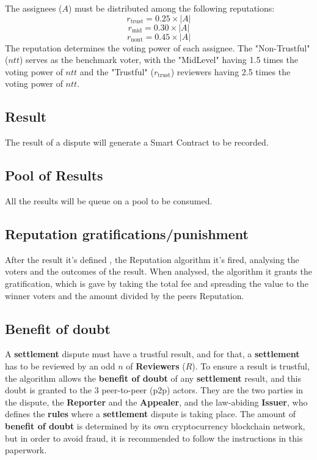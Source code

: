 \documentclass{article}
\begin{document}
The assignees (\(A\)) must be distributed among the following reputations: 
\[ r_{\text{trust}} = 0.25 \times |A|\]
\[ r_{\text{mid}} = 0.30 \times |A|\]
\[ r_{\text{nont}} = 0.45 \times |A| \] 
The reputation determines the voting power of each assignee. The "Non-Trustful" (\(ntt\)) serves as the benchmark voter, with the "MidLevel" having 1.5 times the voting power of \(ntt\) and the "Trustful" (\(r_{\text{trust}}\)) reviewers having 2.5 times the voting power of \(ntt\).

\subsection{Result}

The result of a dispute will generate a Smart Contract to be recorded.

\subsection{Pool of Results}

All the results will be queue on a pool to be consumed.

\subsection{Reputation gratifications/punishment}

After the result it's defined , the Reputation algorithm it's fired, analysing the voters and the outcomes of the result.
When analysed, the algorithm it grants the gratification, which is gave by taking the total fee and spreading the value 
to the winner voters and the amount divided by the peers Reputation.

\subsection{Benefit of doubt}
A \textbf{settlement} dispute must have a trustful result, and for that, a \textbf{settlement} has to be reviewed by an odd \(n\) of \textbf{Reviewers} (\(R\)). To ensure a result is trustful, the algorithm allows the \textbf{benefit of doubt} of any \textbf{settlement} result, and this doubt is granted to the 3 peer-to-peer (p2p) actors. They are the two parties in the dispute, the \textbf{Reporter} and the \textbf{Appealer}, and the law-abiding \textbf{Issuer}, who defines the \textbf{rules} where a \textbf{settlement} dispute is taking place. The amount of \textbf{benefit of doubt} is determined by its own cryptocurrency blockchain network, but in order to avoid fraud, it is recommended to follow the instructions in this paperwork.
\end{document}
